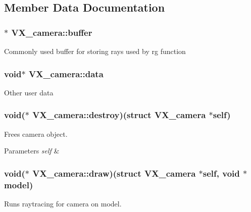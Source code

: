 \subsection{Member Data Documentation}
\hypertarget{structVX__camera_ab99ed3683f52574a5a6dfadac12eb3ea}{
\subsubsection[{buffer}]{$\ast$ V\-X\-\_\-camera\-::buffer}}\label{structVX__camera_ab99ed3683f52574a5a6dfadac12eb3ea}
Commonly used buffer for storing rays used by rg function \hypertarget{structVX__camera_af16b6d657c8c9f9c27764c5c6d923855}{
\subsubsection[{data}]{\setlength{\rightskip}{0pt plus 5cm}void$\ast$ V\-X\-\_\-camera\-::data}}\label{structVX__camera_af16b6d657c8c9f9c27764c5c6d923855}
Other user data \hypertarget{structVX__camera_a507391328f61922afd6369562947e7a8}{
\subsubsection[{destroy}]{\setlength{\rightskip}{0pt plus 5cm}void($\ast$ V\-X\-\_\-camera\-::destroy)(struct {\bf V\-X\-\_\-camera} $\ast$self)}}\label{structVX__camera_a507391328f61922afd6369562947e7a8}
Frees camera object. 
\begin{DoxyParams}{Parameters}
{\em self} & \\
\hline
\end{DoxyParams}
\hypertarget{structVX__camera_ac0a8d4af706ab244df474fa60776d30b}{
\subsubsection[{draw}]{\setlength{\rightskip}{0pt plus 5cm}void($\ast$ V\-X\-\_\-camera\-::draw)(struct {\bf V\-X\-\_\-camera} $\ast$self, void $\ast$model)}}\label{structVX__camera_ac0a8d4af706ab244df474fa60776d30b}
Runs raytracing for camera on model. 
